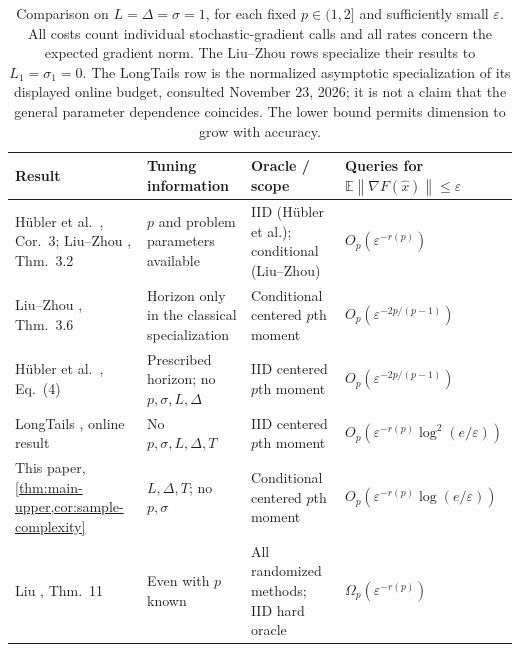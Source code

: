 \documentclass[11pt,a4paper]{article}
\newcommand{\E}{\mathbb{E}}
\newcommand{\eps}{\varepsilon}
\newcommand{\norm}[1]{\left\lVert #1\right\rVert}
\theoremstyle{definition}
\theoremstyle{remark}
\begin{document}
\begin{table}[t]
\centering
\small
\setlength{\tabcolsep}{4pt}
\begin{tabularx}{\textwidth}{@{}
>{\raggedright\arraybackslash}p{}
>{\raggedright\arraybackslash}p{}
>{\raggedright\arraybackslash}p{}
>{\raggedright\arraybackslash}X@{}}
\toprule
Result & Tuning information & Oracle / scope & Queries for
$\E\norm{\nabla F(\widehat x)}\le\eps$\\
\midrule
H\"ubler et al.\ \cite{hubler2025normalization}, Cor.~3;
Liu--Zhou \cite{liuzhou2025}, Thm.~3.2
& $p$ and problem parameters available
& IID (H\"ubler et al.); conditional (Liu--Zhou)
& $O_p(\eps^{-r(p)})$\\[0.35em]
Liu--Zhou \cite{liuzhou2025}, Thm.~3.6
& Horizon only in the classical specialization
& Conditional centered $p$th moment
& $O_p(\eps^{-2p/(p-1)})$\\[0.35em]
H\"ubler et al.\ \cite{hubler2025normalization}, Eq.~(4)
& Prescribed horizon; no $p,\sigma,L,\Delta$
& IID centered $p$th moment
& $O_p(\eps^{-2p/(p-1)})$\\[0.35em]
LongTails \cite{longtails2026stationarity}, online result
& No $p,\sigma,L,\Delta,T$
& IID centered $p$th moment
& $O_p(\eps^{-r(p)}\log^2(e/\eps))$\\[0.35em]
This paper, \cref{thm:main-upper,cor:sample-complexity}
& $L,\Delta,T$; no $p,\sigma$
& Conditional centered $p$th moment
& $O_p(\eps^{-r(p)}\log(e/\eps))$\\[0.35em]
Liu \cite{liu2026oco}, Thm.~11
& Even with $p$ known
& All randomized methods; IID hard oracle
& $\Omega_p(\eps^{-r(p)})$\\
\bottomrule
\end{tabularx}
\caption{Comparison on $L=\Delta=\sigma=1$, for each fixed
$p\in(1,2]$ and sufficiently small $\eps$. All costs count individual
stochastic-gradient calls and all rates concern the expected gradient
norm. The Liu--Zhou rows specialize their results to $L_1=\sigma_1=0$.
The LongTails row is the normalized asymptotic specialization of its
displayed online budget, consulted November 23, 2026; it is not a claim
that the general parameter dependence coincides. The lower bound permits
dimension to grow with accuracy.}\label{tab:comparison}
\end{table}
\end{document}
